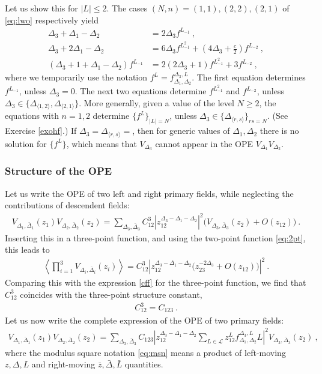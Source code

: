 \documentclass[12pt, a4paper, notitlepage, twoside]{report}
\numberwithin{equation}{section}
\theoremstyle{break}
\begin{document}
Let us show this for $|L|\leq 2$. The cases $(N,n)=(1,1),(2,2),(2,1)$ of \eqref{eq:lwo} respectively yield 
\begin{align}
 \Delta_3 + \Delta_1-\Delta_2 & = 2\Delta_3 f^{L_{-1}} \ ,
 \label{flfo}
 \\
 \Delta_3+ 2\Delta_1-\Delta_2 & = 6\Delta_3 f^{L_{-1}^2} + (4\Delta_3+\tfrac{c}{2})f^{L_{-2}}\ ,
 \\
 (\Delta_3+1+\Delta_1-\Delta_2) f^{L_{-1}} & = 2(2\Delta_3+1) f^{L_{-1}^2} + 3 f^{L_{-2}}\ ,
 \label{flff}
\end{align}
where we temporarily use the notation $f^L=f^{\Delta_3,L}_{\Delta_1,\Delta_2}$.
The first equation determines $f^{L_{-1}}$, unless $\Delta_3=0$. The next two equations determine
$f^{L_{-1}^2}$ and $f^{L_{-2}}$, unless $\Delta_3 \in \{\Delta_{\langle 1,2 \rangle}, \Delta_{\langle 2,1 \rangle}\}$.
More generally, given a value of the level $N\geq 2$, the equations with $n=1,2$ determine $\{f^L\}_{|L|=N}$, unless $\Delta_3\in\{\Delta_{\langle r,s \rangle}\}_{rs=N}$. (See Exercise \ref{exohf}.) If $\Delta_3=\Delta_{\langle r,s \rangle}=$, then for generic values of $\Delta_1,\Delta_2$ there is no solution for $\{f^L\}$, which means that $V_{\Delta_3}$ cannot appear in the OPE $V_{\Delta_1}V_{\Delta_2}$.


\subsubsection{Structure of the OPE}

Let us write the OPE of two left and right primary fields, while neglecting the contributions of descendent fields:
\begin{align}
 V_{\Delta_1,\bar\Delta_1}(z_1) V_{\Delta_2,\bar\Delta_2}(z_2) 
 = 
 \sum_{\Delta_3,\bar\Delta_3} C^{3}_{12}
 \left| z_{12}^{\Delta_3-\Delta_1-\Delta_2}\right|^2 \Big( V_{\Delta_3,\bar\Delta_3}(z_2) + O(z_{12})\Big)\ .
\end{align}
Inserting this in a three-point function, and using the two-point function \eqref{eq:2pt}, this leads to
\begin{align}
 \left<  \prod_{i=1}^3 V_{\Delta_i,\bar\Delta_i}(z_i) \right> 
 = 
 C^3_{12} \left| z_{12}^{\Delta_3-\Delta_1-\Delta_2} \Big( z_{23}^{-2\Delta_3} + O(z_{12}) \Big) \right|^2\ .
\end{align}
Comparing this with the expression \eqref{cff} for the three-point function, we find that $C^3_{12}$ coincides with the three-point structure constant, 
\begin{align}
 C^3_{12}= C_{123}\ .
 \label{cftt}
\end{align}
Let us now write the complete expression of the OPE of two primary fields:
\begin{align}
 \boxed{ V_{\Delta_1,\bar\Delta_1}(z_1) V_{\Delta_2,\bar\Delta_2}(z_2) 
 = 
 \sum_{\Delta_3,\bar\Delta_3} C_{123} \left| z_{12}^{\Delta_3-\Delta_1-\Delta_2}\sum_{L\in\mathcal{L}} z_{12}^Lf^{\Delta_3,L}_{\Delta_1,\Delta_2} L \right|^2 V_{\Delta_3,\bar\Delta_3}(z_2)
 }\ ,
 \label{vvs}
\end{align}
where  the modulus square notation \eqref{eq:msn} means a product of left-moving $z,\Delta,L$ and right-moving $\bar z, \bar \Delta, \bar L$ quantities.
\end{document}
